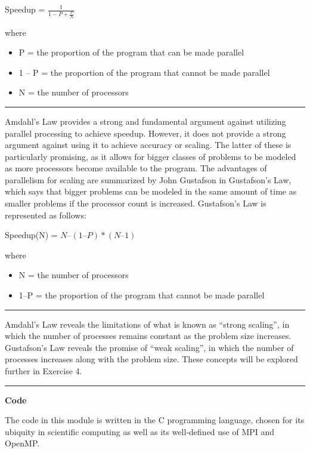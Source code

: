\documentclass[letterpaper,10pt,openany,oneside]{sphinxmanual}
\begin{document}
Speedup = $\frac{1}{1-P+\frac{P}{N}}$

where
\begin{itemize}
\item {} 
P = the proportion of the program that can be made parallel

\item {} 
1 – P = the proportion of the program that cannot be made parallel

\item {} 
N = the number of processors

\end{itemize}


\bigskip\hrule{}\bigskip


Amdahl’s Law provides a strong and fundamental argument against
utilizing parallel processing to achieve speedup. However, it does not
provide a strong argument against using it to achieve accuracy or
scaling. The latter of these is particularly promising, as it allows for
bigger classes of problems to be modeled as more processors become
available to the program. The advantages of parallelism for scaling are
summarized by John Gustafson in Gustafson’s Law, which says that bigger
problems can be modeled in the same amount of time as smaller problems
if the processor count is increased. Gustafson’s Law is represented as
follows:

Speedup(N) = $N–(1–P)*(N–1)$

where
\begin{itemize}
\item {} 
N = the number of processors

\item {} 
1–P = the proportion of the program that cannot be made parallel

\end{itemize}


\bigskip\hrule{}\bigskip


Amdahl’s Law reveals the limitations of what is known as “strong
scaling”, in which the number of processes remains constant as the
problem size increases. Gustafson’s Law reveals the promise of “weak
scaling”, in which the number of processes increases along with the
problem size. These concepts will be explored further in Exercise 4.


\bigskip\hrule{}\bigskip


\textbf{Code}

The code in this module is written in the C programming language, chosen
for its ubiquity in scientific computing as well as its well-defined use
of MPI and OpenMP.
\end{document}

